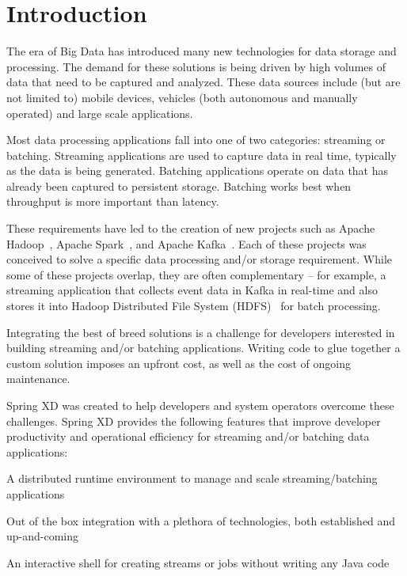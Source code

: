 \section{Introduction}

The era of Big Data has introduced many new technologies for data storage
and processing. The demand for these solutions is being driven by high
volumes of data that need to be captured and analyzed. These data sources
include (but are not limited to) mobile devices, vehicles (both autonomous
and manually operated) and large scale applications.

Most data processing applications fall into one of two categories:
streaming or batching. Streaming applications are used to capture data
in real time, typically as the data is being generated. Batching applications
operate on data that has already been captured to persistent storage. Batching
works best when throughput is more important than latency.

These requirements have led to the creation of new projects such as Apache Hadoop~\cite{hadoop},
Apache Spark~\cite{spark}, and Apache Kafka~\cite{kafka}. Each of these projects was conceived
to solve a specific data processing and/or storage requirement. While some
of these projects overlap, they are often complementary -- for example,
a streaming application that collects event data in Kafka in real-time and also 
stores it into Hadoop Distributed File System (HDFS)~\cite{hdfs} for batch processing.

Integrating the best of breed solutions is a challenge for developers
interested in building streaming and/or batching applications. Writing
code to glue together a custom solution imposes an upfront cost,
as well as the cost of ongoing maintenance.

Spring XD was created to help developers and system operators overcome
these challenges. Spring XD provides the following features that improve developer
productivity and operational efficiency for streaming and/or batching
data applications:
\begin{itemize*}
\item A distributed runtime environment to manage and scale streaming/batching applications
\item Out of the box integration with a plethora of technologies, both established
and up-and-coming
\item An interactive shell for creating streams or jobs without writing any Java code
\end{itemize*}


